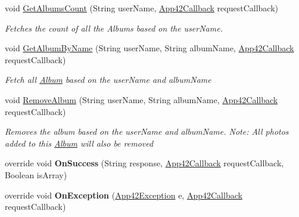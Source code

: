 \begin{DoxyCompactItemize}
void \hyperlink{classcom_1_1shephertz_1_1app42_1_1paas_1_1sdk_1_1windows_1_1gallery_1_1_album_service_a39238a9827374965b2d3e614a7616020}{Get\+Albums\+Count} (String user\+Name, \hyperlink{interfacecom_1_1shephertz_1_1app42_1_1paas_1_1sdk_1_1windows_1_1_app42_callback}{App42\+Callback} request\+Callback)
\begin{DoxyCompactList}\small\item\em Fetches the count of all the Albums based on the user\+Name. \end{DoxyCompactList}\item 
void \hyperlink{classcom_1_1shephertz_1_1app42_1_1paas_1_1sdk_1_1windows_1_1gallery_1_1_album_service_a56e9a72447422cb890cf59808e89d8e4}{Get\+Album\+By\+Name} (String user\+Name, String album\+Name, \hyperlink{interfacecom_1_1shephertz_1_1app42_1_1paas_1_1sdk_1_1windows_1_1_app42_callback}{App42\+Callback} request\+Callback)
\begin{DoxyCompactList}\small\item\em Fetch all \hyperlink{classcom_1_1shephertz_1_1app42_1_1paas_1_1sdk_1_1windows_1_1gallery_1_1_album}{Album} based on the user\+Name and album\+Name \end{DoxyCompactList}\item 
void \hyperlink{classcom_1_1shephertz_1_1app42_1_1paas_1_1sdk_1_1windows_1_1gallery_1_1_album_service_a48b1db6bf63ecfa2027faa7dcd7ac331}{Remove\+Album} (String user\+Name, String album\+Name, \hyperlink{interfacecom_1_1shephertz_1_1app42_1_1paas_1_1sdk_1_1windows_1_1_app42_callback}{App42\+Callback} request\+Callback)
\begin{DoxyCompactList}\small\item\em Removes the album based on the user\+Name and album\+Name. Note\+: All photos added to this \hyperlink{classcom_1_1shephertz_1_1app42_1_1paas_1_1sdk_1_1windows_1_1gallery_1_1_album}{Album} will also be removed \end{DoxyCompactList}\item 
\hypertarget{classcom_1_1shephertz_1_1app42_1_1paas_1_1sdk_1_1windows_1_1gallery_1_1_album_service_aef041eb0d712da58ecc7b29caee83da7}{override void {\bfseries On\+Success} (String response, \hyperlink{interfacecom_1_1shephertz_1_1app42_1_1paas_1_1sdk_1_1windows_1_1_app42_callback}{App42\+Callback} request\+Callback, Boolean is\+Array)}\label{classcom_1_1shephertz_1_1app42_1_1paas_1_1sdk_1_1windows_1_1gallery_1_1_album_service_aef041eb0d712da58ecc7b29caee83da7}

\item 
\hypertarget{classcom_1_1shephertz_1_1app42_1_1paas_1_1sdk_1_1windows_1_1gallery_1_1_album_service_aa94c202b9532de1379a1340dafc782d3}{override void {\bfseries On\+Exception} (\hyperlink{classcom_1_1shephertz_1_1app42_1_1paas_1_1sdk_1_1windows_1_1_app42_exception}{App42\+Exception} e, \hyperlink{interfacecom_1_1shephertz_1_1app42_1_1paas_1_1sdk_1_1windows_1_1_app42_callback}{App42\+Callback} request\+Callback)}\label{classcom_1_1shephertz_1_1app42_1_1paas_1_1sdk_1_1windows_1_1gallery_1_1_album_service_aa94c202b9532de1379a1340dafc782d3}

\end{DoxyCompactItemize}
